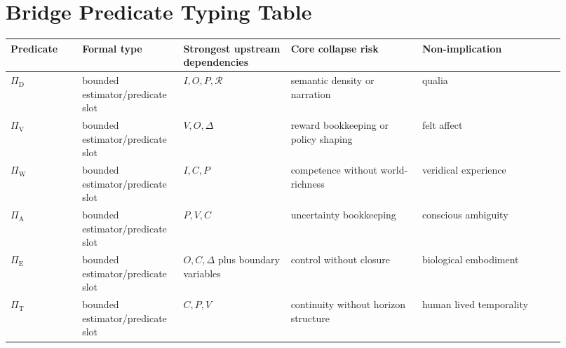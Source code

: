 \documentclass[11pt,a4paper]{article}
\theoremstyle{definition}
\newcommand{\SelfIndex}{I}
\newcommand{\OwnField}{O}
\newcommand{\ContField}{C}
\newcommand{\Persp}{P}
\newcommand{\ValAsym}{V}
\newcommand{\IntervProf}{\Delta}
\newcommand{\Irred}{\mathcal{R}}
\newcommand{\PiD}{\Pi_{\mathrm{D}}}
\newcommand{\PiV}{\Pi_{\mathrm{V}}}
\newcommand{\PiW}{\Pi_{\mathrm{W}}}
\newcommand{\PiA}{\Pi_{\mathrm{A}}}
\newcommand{\PiE}{\Pi_{\mathrm{E}}}
\newcommand{\PiT}{\Pi_{\mathrm{T}}}
\begin{document}
\section{Bridge Predicate Typing Table}
\begin{center}
\small
\begin{tabularx}{\linewidth}{@{}p{0.12\linewidth}p{0.16\linewidth}p{0.18\linewidth}p{0.22\linewidth}p{0.24\linewidth}@{}}
\toprule
Predicate & Formal type & Strongest upstream dependencies & Core collapse risk & Non-implication \\
\midrule
$\PiD$ & bounded estimator/predicate slot & $\SelfIndex,\OwnField,\Persp,\Irred$ & semantic density or narration & qualia \\
$\PiV$ & bounded estimator/predicate slot & $\ValAsym,\OwnField,\IntervProf$ & reward bookkeeping or policy shaping & felt affect \\
$\PiW$ & bounded estimator/predicate slot & $\SelfIndex,\ContField,\Persp$ & competence without world-richness & veridical experience \\
$\PiA$ & bounded estimator/predicate slot & $\Persp,\ValAsym,\ContField$ & uncertainty bookkeeping & conscious ambiguity \\
$\PiE$ & bounded estimator/predicate slot & $\OwnField,\ContField,\IntervProf$ plus boundary variables & control without closure & biological embodiment \\
$\PiT$ & bounded estimator/predicate slot & $\ContField,\Persp,\ValAsym$ & continuity without horizon structure & human lived temporality \\
\bottomrule
\end{tabularx}
\end{center}
\end{document}
